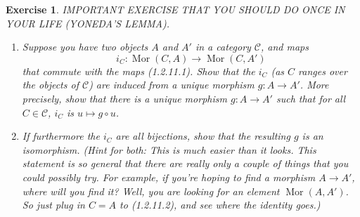 \documentclass{article}
\theoremstyle{breakstyle}
\newtheorem{exercise}{Exercise}[section]
\DeclareMathOperator{\mor}{Mor}
\begin{document}
\begin{exercise}
IMPORTANT EXERCISE THAT YOU SHOULD DO ONCE IN YOUR LIFE (YONEDA'S LEMMA).

\begin{enumerate}[label=({\alph*})]
\item Suppose you have two objects $A$ and $A'$ in a category $\mathcal{C}$,
    and maps
    $$
    i_{C} \colon \mor(C, A) \longrightarrow \mor(C, A')
    $$
    that commute with the maps (1.2.11.1). Show that the $i_C$ (as $C$
    ranges over the objects of $\mathcal{C}$) are induced from a unique
    morphism $g\colon A\to A'$. More precisely, show that there is a unique
    morphism $g \colon A \to A'$ such that for all $C \in \mathcal{C}$,
    $i_C$ is $u \mapsto g \circ u$.
\item If furthermore the $i_C$ are all bijections, show that the resulting
    $g$ is an isomorphism. (Hint for both: This is much easier than it
    looks. This statement is so general that there are really only a couple
    of things that you could possibly try. For example, if you're hoping to
    find a morphism $A \to A'$, where will you find it? Well, you are
    looking for an element $\mor(A, A')$. So just plug in $C = A$ to
    (1.2.11.2), and see where the identity goes.)
\end{enumerate}


\end{exercise}
\end{document}
